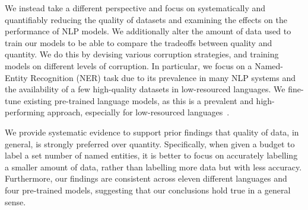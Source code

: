 We instead take a different perspective and focus on systematically and quantifiably reducing the quality of datasets and examining the effects on the performance of NLP models. We additionally alter the amount of data used to train our models to be able to compare the tradeoffs between quality and quantity. We do this by devising various corruption strategies, and training models on different levels of corruption.
In particular, we focus on a Named-Entity Recognition (NER) task due to its prevalence in many NLP systems and the availability of a few high-quality datasets in low-resourced languages. We fine-tune existing pre-trained language models, as this is a prevalent and high-performing approach, especially for low-resourced languages~\citep{ogueji2021Small,adelani2021MasakhaNER,alabi2022Multilingual}. 

We provide systematic evidence to support prior findings that quality of data, in general, is strongly preferred over quantity. Specifically, when given a budget to label a set number of named entities, it is better to focus on accurately labelling a smaller amount of data, rather than labelling more data but with less accuracy. Furthermore, our findings are consistent across eleven different languages and four pre-trained models, suggesting that our conclusions hold true in a general sense.